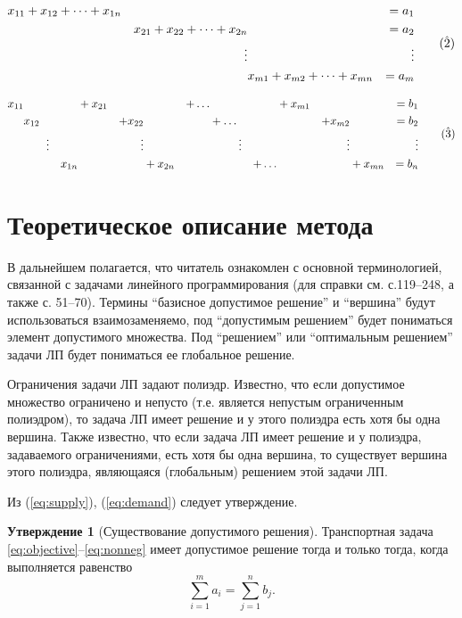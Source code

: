 \documentclass[12pt]{article}
\theoremstyle{definition}
\theoremstyle{plain}
\theoremstyle{definition}
\begin{document}
\begin{equation}
\begin{aligned}
& x_{11} + x_{12} + \dots + x_{1n} &&&= a_1 \\
&& x_{21} + x_{22} + \dots + x_{2n} &&= a_2 \\
&& \vdots && \vdots\\
&&& x_{m1} + x_{m2} + \dots + x_{mn} &= a_m
\end{aligned}
\tag{\(\hat{2}\)}
\label{eq:supply_hat}
\end{equation}

\begin{equation}
\begin{aligned}
x_{11} &&&+ x_{21} &&&+ \dots &&&+ x_{m1} &&&= b_1 \\
& x_{12} &&&+ x_{22} &&&+ \dots &&&+ x_{m2} &&= b_2 \\
& \qquad \vdots &&& \vdots &&& \qquad \;\; \vdots &&& \vdots && \vdots\\
&& x_{1n} &&&+ x_{2n} &&&+ \dots &&&+ x_{mn} &= b_n
\end{aligned}
\tag{\(\hat{3}\)}
\label{eq:demand_hat}
\end{equation}




\section{Теоретическое описание метода}

В дальнейшем полагается, что читатель ознакомлен с основной терминологией,
связанной с задачами линейного программирования (для справки см. \cite{conf2} с.119--248,
а также \cite{conf4} с. 51--70).
Термины ``базисное допустимое решение'' и ``вершина'' будут использоваться взаимозаменяемо,
под ``допустимым решением'' будет пониматься элемент допустимого множества.
Под ``решением'' или ``оптимальным решением'' задачи ЛП будет пониматься ее глобальное решение.

Ограничения задачи ЛП задают полиэдр. Известно, что если допустимое множество
ограничено и непусто (т.е. является непустым ограниченным полиэдром),
то задача ЛП имеет решение и у этого полиэдра есть хотя бы одна вершина.
Также известно, что если задача ЛП имеет решение и у полиэдра,
задаваемого ограничениями, есть хотя бы одна вершина,
то существует вершина этого полиэдра, являющаяся (глобальным) решением этой задачи ЛП.

Из (\ref{eq:supply}), (\ref{eq:demand}) следует утверждение.

\newtheorem{assertionlocal}{Утверждение}
\begin{assertionlocal}[Существование допустимого решения]
Транспортная задача \eqref{eq:objective}--\eqref{eq:nonneg} имеет допустимое решение
тогда и только тогда, когда выполняется равенство
\begin{equation}
\sum_{i=1}^{m} a_i = \sum_{j=1}^{n} b_j.
\label{eq:dem_sup}
\end{equation}
\end{assertionlocal}
\end{document}
